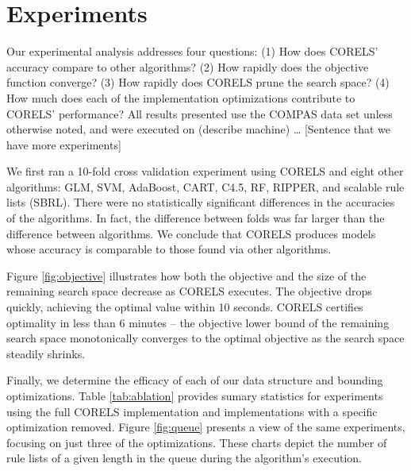 \section{Experiments}
\label{sec:experiments}

Our experimental analysis addresses four questions:
(1) How does CORELS' accuracy compare to other algorithms?
(2) How rapidly does the objective function converge?
(3) How rapidly does CORELS prune the search space?
(4) How much does each of the implementation optimizations contribute to CORELS' performance?
All results presented use the COMPAS data set unless otherwise noted,
and were executed on (describe machine) \dots
[Sentence that we have more experiments]

We first ran a 10-fold cross validation experiment using CORELS and eight other algorithms:
GLM, SVM, AdaBoost, CART, C4.5, RF, RIPPER, and scalable rule lists (SBRL).
There were no statistically significant differences in the accuracies of the
algorithms. In fact, the difference between folds was far larger than the difference
between algorithms. We conclude that CORELS produces models whose accuracy is comparable
to those found via other algorithms.

Figure \ref{fig:objective} illustrates how both the objective and the size of
the remaining search space decrease as CORELS executes.
The objective drops quickly, achieving the optimal value within 10 seconds.
CORELS certifies optimality in less than 6 minutes --
the objective lower bound of the remaining search space
monotonically converges to the optimal objective
as the search space steadily shrinks.

Finally, we determine the efficacy of each of our data structure and bounding
optimizations.
Table \ref{tab:ablation} provides sumary statistics for experiments using
the full CORELS implementation and implementations with a specific
optimization removed.
Figure \ref{fig:queue} presents a view of the same experiments, focusing
on just three of the optimizations. These charts depict the number of rule
lists of a given length in the queue during the algorithm's execution.

